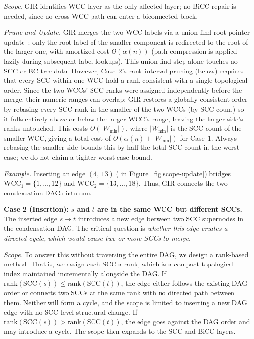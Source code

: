 \textit{Scope.} GIR identifies WCC layer as the only affected layer; no BiCC
repair is needed, since no cross-WCC path can enter a biconnected block.

\textit{Prune and Update.} GIR merges the two WCC labels via a union-find
root-pointer update~\cite{tarjan1975efficiency}: only the root label of the
smaller component is redirected to the root of the larger one, with amortized
cost $O(\alpha(n))$ (path compression is applied lazily during subsequent
label lookups). This union-find step alone touches no SCC or BC tree data.
However, Case~2's rank-interval pruning (below) requires that every SCC
within one WCC hold a rank consistent with a single topological order.
Since the two WCCs' SCC ranks were assigned independently before the merge,
their numeric ranges can overlap; GIR restores a globally consistent order by
rebasing every SCC rank in the smaller of the two WCCs (by SCC count) so it
falls entirely above or below the larger WCC's range, leaving the larger
side's ranks untouched. This costs $O(|W_{\min}|)$, where $|W_{\min}|$ is the
SCC count of the smaller WCC, giving a total cost of
$O(\alpha(n) + |W_{\min}|)$ for Case~1. Always rebasing the smaller side
bounds this by half the total SCC count in the worst case; we do not claim a
tighter worst-case bound.


\textit{Example.}
Inserting an edge $(4,\,13)$ ( in Figure~\ref{fig:scope-update})
bridges $\text{WCC}_1 = \{1, ..., 12\}$ and $\text{WCC}_2 = \{13, ..., 18\}$.
Thus, GIR connects the two condensation DAGs into one.





\textbf{Case 2 (Insertion): $s$ and $t$ are in the same WCC but different SCCs.}
The inserted edge $s \to t$ introduces a new edge between two SCC supernodes in the condensation DAG.
The critical question is \textit{whether this edge creates a directed cycle, which would cause two or more SCCs to merge}.

\textit{Scope.} To answer this without traversing the entire DAG, we design a rank-based method. 
That is, we assign each SCC a {rank}, which is a compact topological index maintained incrementally alongside the DAG.
If $\mathrm{rank}(\mathrm{SCC}(s)) \le \mathrm{rank}(\mathrm{SCC}(t))$, the edge either follows the existing DAG order or connects two SCCs at the same rank with no directed path between them.
Neither will form a cycle, and the scope is limited to inserting a new DAG edge with no SCC-level structural change.
If $\mathrm{rank}(\mathrm{SCC}(s)) > \mathrm{rank}(\mathrm{SCC}(t))$, the edge goes against the DAG order and may introduce a cycle.
The scope then expands to the SCC and BiCC layers.

